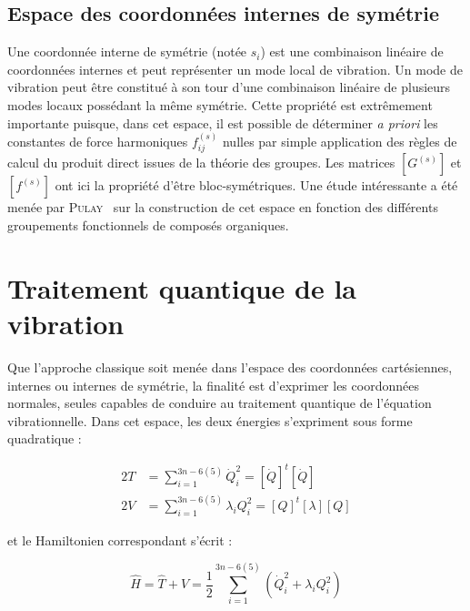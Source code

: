 \documentclass[12pt,a4paper]{book}
\begin{document}
\subsection{Espace des coordonnées internes de symétrie}

Une coordonnée interne de symétrie (notée $s_i$) est une combinaison linéaire de coordonnées internes et peut représenter un mode local de vibration. Un mode de vibration peut être constitué à son tour d'une combinaison linéaire de plusieurs modes locaux possédant la même symétrie. Cette propriété est extrêmement importante puisque, dans cet espace, il est possible de déterminer \textit{a priori} les constantes de force harmoniques $f^{(s)}_{ij}$ nulles par simple application des règles de calcul du produit direct issues de la théorie des groupes. Les matrices $\left[G^{(s)}\right]$ et $\left[f^{(s)}\right]$ ont ici la propriété d'être bloc-symétriques. Une étude intéressante a été menée par \textsc{Pulay}~\cite{pulay1979systematic} sur la construction de cet espace en fonction des différents groupements fonctionnels de composés organiques.


\section{Traitement quantique de la vibration}

Que l'approche classique soit menée dans l'espace des coordonnées cartésiennes, internes ou internes de symétrie, la finalité est d'exprimer les coordonnées normales, seules capables de conduire au traitement quantique de l'équation vibrationnelle. Dans cet espace, les deux énergies s'expriment sous forme quadratique :

\begin{align}
2T &= \sum^{3n-6(5)}_{i=1} \dot{Q}^2_i = \left[\dot{Q}\right]^t\left[\dot{Q}\right] \\
2V &= \sum^{3n-6(5)}_{i=1} \lambda_i Q^2_i = \left[Q\right]^t\left[\lambda\right]\left[Q\right]
\end{align}

\noindent et le Hamiltonien correspondant s'écrit :

\begin{equation}
\hat{H} = \hat{T} + \hat{V} = \frac{1}{2} \sum^{3n-6(5)}_{i=1} \left(\dot{Q}^2_i + \lambda_i Q^2_i\right)
\end{equation}
\end{document}
